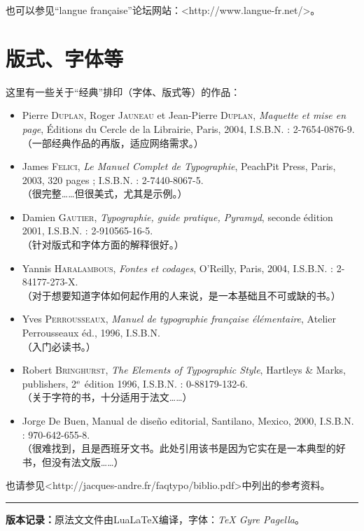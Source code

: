 也可以参见``langue française''论坛网站：<http://www.langue-fr.net/>。

\section{版式、字体等}

这里有一些关于``经典''排印（字体、版式等）的作品：

\begin{itemize}[resume]
    \item Pierre \textsc{Duplan}, Roger \textsc{Jauneau} et Jean-Pierre \textsc{Duplan}, \emph{Maquette et mise en page}, Éditions du Cercle de la Librairie, Paris, 2004, I.S.B.N. : 2-7654-0876-9. \\
    （一部经典作品的再版，适应网络需求。）
    \item James \textsc{Felici}, \emph{Le Manuel Complet de Typographie}, PeachPit Press, Paris, 2003, 320 pages ; I.S.B.N. : 2-7440-8067-5.\\
    （很完整……但很美式，尤其是示例。）
    \item Damien \textsc{Gautier}, \emph{Typographie, guide pratique, Pyramyd}, seconde édition 2001, I.S.B.N. : 2-910565-16-5.\\
    （针对版式和字体方面的解释很好。）
    \item Yannis \textsc{Haralambous}, \emph{Fontes et codages}, O'Reilly, Paris, 2004, I.S.B.N. : 2-84177-273-X.\\
    （对于想要知道字体如何起作用的人来说，是一本基础且不可或缺的书。）
    \item Yves \textsc{Perrousseaux}, \emph{Manuel de typographie française élémentaire}, Atelier Perrousseaux éd., 1996, I.S.B.N.\\ 
    （入门必读书。）
    \item Robert \textsc{Bringhurst}, \emph{The Elements of Typographic Style}, Hartleys \& Marks, publishers, 2$^{\rm e}$ édition 1996, I.S.B.N. : 0-88179-132-6.\\
    （关于字符的书，十分适用于法文……）
    \item Jorge De Buen, Manual de diseño editorial, Santilano, Mexico, 2000, I.S.B.N. : 970-642-655-8.\\
    （很难找到，且是西班牙文书。此处引用该书是因为它实在是一本典型的好书，但没有法文版……）
\end{itemize}

也请参见<http://jacques-andre.fr/faqtypo/biblio.pdf>中列出的参考资料。

\vfill

\begin{center}
    \rule{.75\linewidth}{.5pt}

    \textbf{版本记录：}原法文文件由Lua\LaTeX 编译，字体：\emph{TeX Gyre Pagella}。
\end{center}
